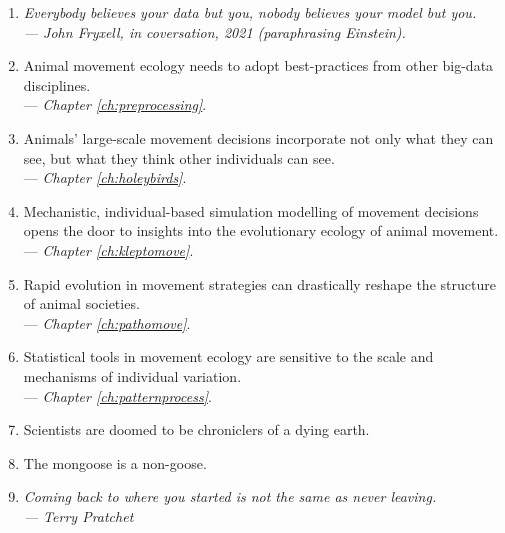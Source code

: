 \begin{onehalfspace}
    \begin{enumerate}
        \item \textit{Everybody believes your data but you, nobody believes your model but you.\\ --- John Fryxell, in coversation, 2021 (paraphrasing Einstein).}

        \item Animal movement ecology needs to adopt best-practices from other big-data disciplines.\\ --- \textit{Chapter \ref{ch:preprocessing}}.

        \item Animals' large-scale movement decisions incorporate not only what they can see, but what they think other individuals can see.\\ --- \textit{Chapter \ref{ch:holeybirds}}.

        \item Mechanistic, individual-based simulation modelling of movement decisions opens the door to insights into the evolutionary ecology of animal movement. \\ --- \textit{Chapter \ref{ch:kleptomove}}.

        \item Rapid evolution in movement strategies can drastically reshape the structure of animal societies.\\ --- \textit{Chapter \ref{ch:pathomove}}.
        
        \item Statistical tools in movement ecology are sensitive to the scale and mechanisms of individual variation.\\ --- \textit{Chapter \ref{ch:patternprocess}}.
        
        \item Scientists are doomed to be chroniclers of a dying earth.
        
        \item The mongoose is a non-goose.

        \item \textit{Coming back to where you started is not the same as never leaving.\\--- Terry Pratchet}
    \end{enumerate}

\end{onehalfspace}

\endgroup

\vfill

\clearpage
